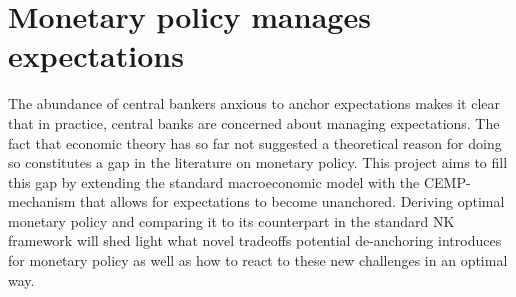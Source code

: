\documentclass[11pt]{article}
\renewcommand{\[}{\begin{equation}}
\renewcommand{\]}{\end{equation}}
\begin{document}
 \section{Monetary policy manages expectations}
 The abundance of central bankers anxious to anchor expectations makes it clear that in practice, central banks are concerned about managing expectations. The fact that economic theory has so far not suggested a theoretical reason for doing so constitutes a gap in the literature on monetary policy. This project aims to fill this gap by extending the standard macroeconomic model with the CEMP-mechanism that allows for expectations to become unanchored. Deriving optimal monetary policy and comparing it to its counterpart in the standard NK framework will shed light what novel tradeoffs potential de-anchoring introduces for monetary policy as well as how to react to these new challenges in an optimal way. 
 

%
% 

\newpage


\nocite{*}
\end{document}
